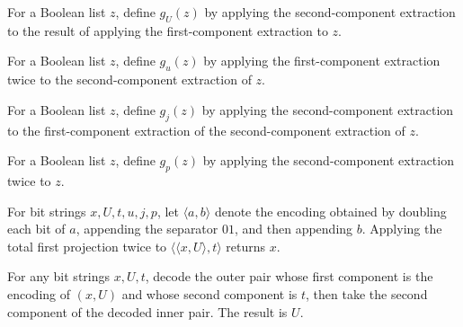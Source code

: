 \begin{definition}
\label{Complexity.KarpLipton.gU}
\leanok
{}
For a Boolean list $z$, define $g_U(z)$ by applying the second-component extraction to
the result of applying the first-component extraction to $z$.
\end{definition}

\begin{definition}
\label{Complexity.KarpLipton.gu}
\leanok
{}
For a Boolean list $z$, define $g_u(z)$ by applying the first-component extraction twice
to the second-component extraction of $z$.
\end{definition}

\begin{definition}
\label{Complexity.KarpLipton.gj}
\leanok
{}
For a Boolean list $z$, define $g_j(z)$ by applying the second-component extraction to
the first-component extraction of the second-component extraction of $z$.
\end{definition}

\begin{definition}
\label{Complexity.KarpLipton.gp}
\leanok
{}
For a Boolean list $z$, define $g_p(z)$ by applying the second-component extraction
twice to $z$.
\end{definition}

\begin{theorem}
\label{Complexity.KarpLipton.gx_pair}
\leanok
{}
For bit strings $x,U,t,u,j,p$, let $\langle a,b\rangle$ denote the encoding obtained by
doubling each bit of $a$, appending the separator $01$, and then appending $b$. Applying
the total first projection twice to $\langle\langle x,U\rangle,t\rangle$ returns $x$.
\end{theorem}

\begin{theorem}
\label{Complexity.KarpLipton.gU_pair}
\leanok
{}
For any bit strings $x,U,t$, decode the outer pair whose first component is the encoding
of $(x,U)$ and whose second component is $t$, then take the second component of the
decoded inner pair. The result is $U$.
\end{theorem}


